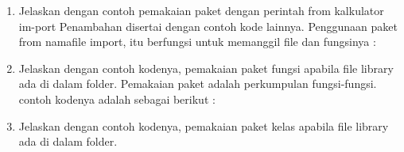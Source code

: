 \begin{enumerate}
    \item Jelaskan dengan contoh pemakaian paket dengan perintah from kalkulator im-port Penambahan disertai dengan contoh kode lainnya.
    Penggunaan paket from namafile import, itu berfungsi untuk memanggil file dan fungsinya :
    

    \item Jelaskan dengan contoh kodenya, pemakaian paket fungsi apabila file library ada di dalam folder.
    Pemakaian paket adalah perkumpulan fungsi-fungsi. contoh kodenya adalah sebagai berikut :

    \item Jelaskan dengan contoh kodenya, pemakaian paket kelas apabila file library ada di dalam folder.
    

\end{enumerate}

